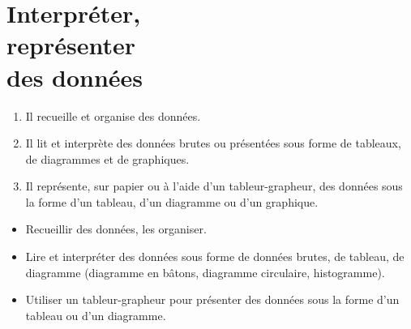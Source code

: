 \themaD
\graphicspath{{../../S06_Interpreter_representer_des_donnees/Images/}}



\chapter{Interpréter,\\représenter\\des données}
\label{S06}

\begin{autoeval}
   \small
   \begin{enumerate}
      \item Il recueille et organise des données.
      \item Il lit et interprète des données brutes ou présentées sous forme de tableaux, de diagrammes et de graphiques.
      \item Il représente, sur papier ou à l’aide d’un tableur-grapheur, des données sous la forme d’un tableau, d’un diagramme ou d’un graphique.
   \end{enumerate}
\end{autoeval}

\begin{prerequis}
   \begin{itemize}
      \item[\com] Recueillir des données, les organiser.
      \item[\com] Lire et interpréter des données sous forme de données brutes, de tableau, de diagramme (diagramme en bâtons, diagramme circulaire, histogramme).
      \item[\com] Utiliser un tableur-grapheur pour présenter des données sous la forme d’un tableau ou d’un diagramme.
   \end{itemize}
\end{prerequis}

\vfill



